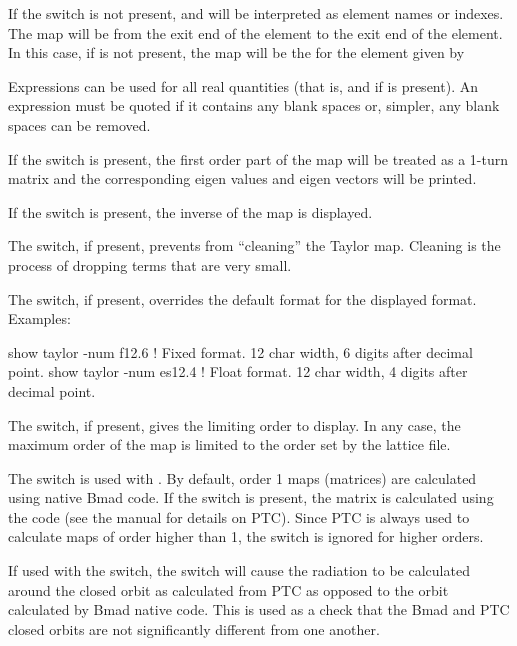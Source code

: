 {{{{{{{{{{{If the  switch is not present,  and  will be interpreted as element names
or indexes. The map will be from the exit end of the  element to the exit end of the
 element. In this case, if  is not present, the map will be the for the element
given by 

Expressions can be used for all real quantities (that is,  and  if  is
present). An expression must be quoted if it contains any blank spaces or, simpler, any blank spaces
can be removed.

If the  switch is present, the first order part of the map will be treated as a
1-turn matrix and the corresponding eigen values and eigen vectors will be printed.

If the  switch is present, the inverse of the map is displayed.

The  switch, if present, prevents \tao from ``cleaning'' the Taylor map. Cleaning
is the process of dropping terms that are very small.

The  switch, if present, overrides the default format for the displayed format.
Examples:
\begin{example}
  show taylor -num f12.6  ! Fixed format. 12 char width, 6 digits after decimal point.
  show taylor -num es12.4 ! Float format. 12 char width, 4 digits after decimal point.
\end{example}

The  switch, if present, gives the limiting order to display. In any case, the
maximum order of the map is limited to the order set by the lattice file.

The  switch is used with . By default, order 1 maps (matrices) are calculated
using native Bmad code. If the  switch is present, the matrix is calculated using the
 code (see the \bmad manual for details on PTC). Since PTC is always used to calculate maps
of order higher than 1, the  switch is ignored for higher orders. 

If used with the
 switch, the  switch will cause the radiation to be calculated around the
closed orbit as calculated from PTC as opposed to the orbit calculated by Bmad native code.
This is used as a check that the Bmad and PTC closed orbits are not significantly different
from one another.

}}}}}}}}}}}
